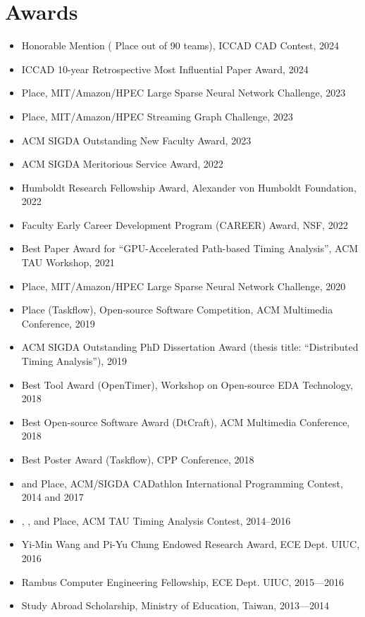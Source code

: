 \documentclass[A4,11pt]{article}
\begin{document}
\section{Awards}
 \begin{itemize}
 \itemsep-3pt
    \item Honorable Mention ( Place out of 90 teams), ICCAD CAD Contest, 2024
    \item ICCAD 10-year Retrospective Most Influential Paper Award, 2024
    \item {} Place, MIT/Amazon/HPEC Large Sparse Neural Network Challenge, 2023
    \item {} Place, MIT/Amazon/HPEC Streaming Graph Challenge, 2023
    \item ACM SIGDA Outstanding New Faculty Award, 2023
    \item ACM SIGDA Meritorious Service Award, 2022
    \item Humboldt Research Fellowship Award, Alexander von Humboldt Foundation, 2022
    \item Faculty Early Career Development Program (CAREER) Award, NSF, 2022
    \item Best Paper Award for ``GPU-Accelerated Path-based Timing Analysis'', ACM TAU Workshop, 2021
    \item {} Place, MIT/Amazon/HPEC Large Sparse Neural Network Challenge, 2020
    \item {} Place (Taskflow), Open-source Software Competition, ACM Multimedia Conference, 2019
    \item ACM SIGDA Outstanding PhD Dissertation Award (thesis title: ``Distributed Timing Analysis''), 2019
    \item Best Tool Award (OpenTimer), Workshop on Open-source EDA Technology, 2018
    \item Best Open-source Software Award (DtCraft), ACM Multimedia Conference, 2018
    \item Best Poster Award (Taskflow), CPP Conference, 2018
    \item {} and  Place, ACM/SIGDA CADathlon International Programming Contest, 2014 and 2017
    \item {}, , and  Place, ACM TAU Timing Analysis Contest, 2014--2016
    \item Yi-Min Wang and Pi-Yu Chung Endowed Research Award, ECE Dept. UIUC, 2016
    \item Rambus Computer Engineering Fellowship, ECE Dept. UIUC, 2015—2016
    \item Study Abroad Scholarship, Ministry of Education, Taiwan, 2013—2014

\end{itemize}
\end{document}
